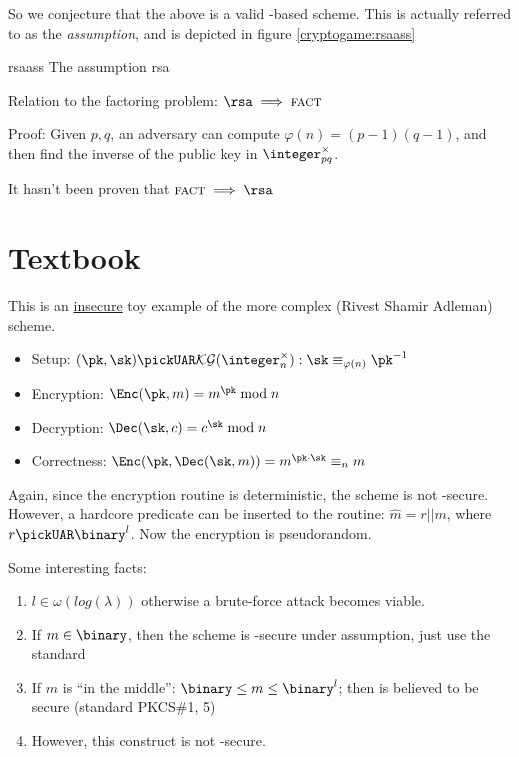 So we conjecture that the above is a valid \tdp-based \pke{} scheme. This is actually referred to as the \emph{\rsa{} assumption}, and is depicted in figure \ref{cryptogame:rsaass}

\begin{cryptogame}
    {rsaass}
    {The \rsa{} assumption}
    {rsa}


    \cseqdelay


\end{cryptogame}


Relation to the factoring problem: $\rsa \implies \textsc{fact}$

Proof: Given $p, q$, an adversary can compute $\varphi(n) = (p - 1)(q - 1)$, and then find the inverse of the public key in $\integer_{pq}^\times$.

It hasn't been proven that $\textsc{fact} \implies \rsa$

\section{Textbook \rsa}

This is an \underline{insecure} toy example of the more complex \rsa{} (Rivest Shamir Adleman) scheme.

\begin{itemize}
    \item Setup: $(\pk, \sk) \pickUAR \keygen(\integer_n^\times) : \sk \equiv_{\varphi(n)} \pk^{-1}$
    \item Encryption: $\Enc(\pk, m) = m^{\pk} \mod n$
    \item Decryption: $\Dec(\sk, c) = c^{\sk} \mod n$
    \item Correctness: $\Enc(\pk, \Dec(\sk, m)) = m^{\pk \cdot \sk} \equiv_n m$
\end{itemize}

Again, since the encryption routine is deterministic, the scheme is not \cpa-secure. However, a hardcore predicate can be inserted to the routine: $\hat{m} = r||m$, where $r \pickUAR \binary^l$. Now the encryption is pseudorandom.

Some interesting facts:
\begin{enumerate}
    \item $l \in \omega(log(\lambda))$ otherwise a brute-force attack becomes viable.
    \item If $m \in \binary$, then the scheme is \cpa-secure under \rsa{} assumption, just use the standard \tdp{}
    \item If $m$ is ``in the middle'': $\binary \leq m \leq \binary^l$; then \rsa{} is believed to be secure (standard PKCS\#1, 5)
    \item However, this construct is not \cca-secure.
\end{enumerate}

